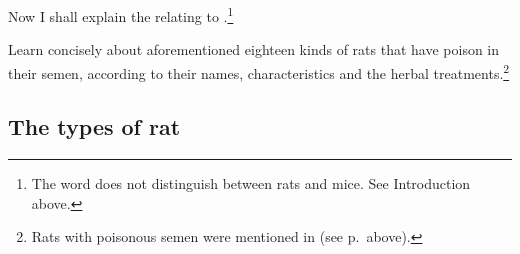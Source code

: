 \begin{translation}
    
    \item[1] 
    
Now I shall explain the  relating to 
.\footnote{The word  does not distinguish 
between rats and mice.  See Introduction above.}
    
    \item[3] 
    
    Learn concisely about aforementioned eighteen kinds of rats that have 
    poison in their semen, according to their names, characteristics and the 
    herbal treatments.\footnote{Rats with poisonous semen were mentioned 
    in  (see p.\,\pageref{sukravisa} above).}
    
\subsection{The types of rat}
    \item[4--6]
    

\end{translation}
